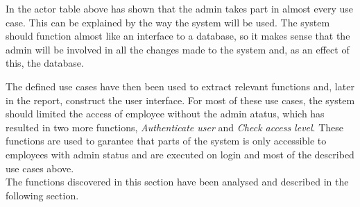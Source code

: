 In the actor table above has shown that the admin takes part in almost every use case. This can be explained by the way the system will be used. The system should function almost like an interface to a database, so it makes sense that the admin will be involved in all the changes made to the system and, as an effect of this, the database.
\par

The defined use cases have then been used to extract relevant functions and, later in the report, construct the user interface. For most of these use cases, the system should limited the access of employee without the admin atatus, which has resulted in two more functions, \textit{Authenticate user} and \textit{Check access level}. These functions are used to garantee that parts of the system is only accessible to employees with admin status and are executed on login and most of the described use cases above.\\

The functions discovered in this section have been analysed and described in the following section.
